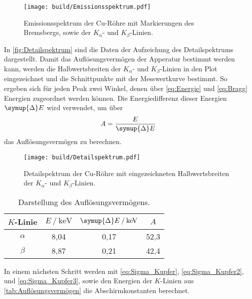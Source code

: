 \begin{figure}[H]
  \centering
  \texttt{[image: build/Emissionsspektrum.pdf]}
  \caption{Emissionsspektrum der Cu-Röhre mit Markierungen des Bremsbergs, sowie der $K_{\alpha}$- und $K_{\beta}$-Linien.}
  \label{fig:Emissionsspektrum}
\end{figure}

In \autoref{fig:Detailspektrum} sind die Daten der Aufzeichung des Detailspektrums dargestellt. Damit das Auflösungsvermögen
der Apperatur bestimmt werden kann, werden die Halbwertsbreiten der $K_{\alpha}$- und $K_{\beta}$-Linien in den Plot eingezeichnet 
und die Schnittpunkte mit der Messwertkurve bestimmt. So ergeben sich für jeden Peak zwei Winkel, denen über \eqref{eq:Energie} und \eqref{eq:Bragg}
Energien zugeordnet werden können. Die Energiedifferenz dieser Energien $\symup{\Delta}E$ wird verwendet, um über
\begin{equation*}
  A = \frac{E}{\symup{\Delta}E}
\end{equation*}
das Auflösungsvermögen zu berechnen. 

\begin{figure}[H]
  \centering
  \texttt{[image: build/Detailspektrum.pdf]}
  \caption{Detailspektrum der Cu-Röhre mit eingezeichneten Halbwertsbreiten der $K_{\alpha}$- und $K_{\beta}$-Linien.}
  \label{fig:Detailspektrum}
\end{figure}

\begin{table}
  \centering
  \caption{Darstellung des Auflösungsvermögens.}
  \label{tab:Auflösungsvermögen}
  \begin{tabular}{c S[table-format=1.2] S[table-format=1.2] S[table-format=2.1]}
    \toprule
    {$K$-Linie} & {$E \mathbin{/} \unit{\kilo\electronvolt}$} & {$\symup{\Delta}E \mathbin{/} \unit{\kilo\electronvolt}$} &%
    {$A$}\\
    \midrule
    $\alpha$  & 8,04 & 0,17 & 52,3 \\
    $\beta$   & 8,87 & 0,21 & 42,4 \\
    \bottomrule
  \end{tabular}
\end{table}

In einem nächsten Schritt werden mit \eqref{eq:Sigma_Kupfer}, \eqref{eq:Sigma_Kupfer2}, und \eqref{eq:Sigma_Kupfer3}, sowie den
Energien der $K$-Linien aus \autoref{tab:Auflösungsvermögen} die Abschirmkonstanten berechnet. 

